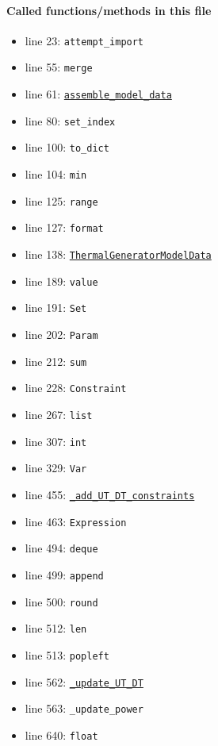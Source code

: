 \documentclass[11pt]{report}
\begin{document}
\paragraph{Called functions/methods in this file}
\begin{itemize}[leftmargin=*]
  \item line 23: \texttt{attempt\_import}
  \item line 55: \texttt{merge}
  \item line 61: \hyperref[def:examples-thermal_generator.py:ThermalGenerator.assemble_model_data:L66]{\texttt{assemble\_model\_data}}
  \item line 80: \texttt{set\_index}
  \item line 100: \texttt{to\_dict}
  \item line 104: \texttt{min}
  \item line 125: \texttt{range}
  \item line 127: \texttt{format}
  \item line 138: \hyperref[def:model_data.py:ThermalGeneratorModelData:L185]{\texttt{ThermalGeneratorModelData}}
  \item line 189: \texttt{value}
  \item line 191: \texttt{Set}
  \item line 202: \texttt{Param}
  \item line 212: \texttt{sum}
  \item line 228: \texttt{Constraint}
  \item line 267: \texttt{list}
  \item line 307: \texttt{int}
  \item line 329: \texttt{Var}
  \item line 455: \hyperref[def:examples-thermal_generator.py:ThermalGenerator._add_UT_DT_constraints:L174]{\texttt{\_add\_UT\_DT\_constraints}}
  \item line 463: \texttt{Expression}
  \item line 494: \texttt{deque}
  \item line 499: \texttt{append}
  \item line 500: \texttt{round}
  \item line 512: \texttt{len}
  \item line 513: \texttt{popleft}
  \item line 562: \hyperref[def:examples-thermal_generator.py:ThermalGenerator._update_UT_DT:L480]{\texttt{\_update\_UT\_DT}}
  \item line 563: \texttt{\_update\_power}
  \item line 640: \texttt{float}

\end{itemize}
\end{document}
